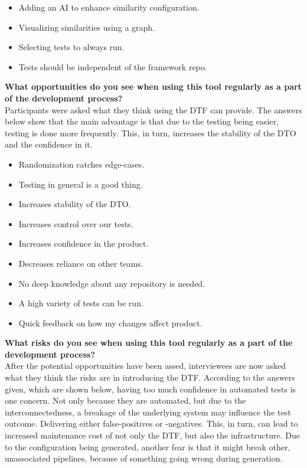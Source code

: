 \begin{itemize}
    \item Adding an AI to enhance similarity configuration.
    \item Visualizing similarities using a graph.
    \item Selecting tests to always run.
    \item Tests should be independent of the framework repo.
\end{itemize}

\textbf{What opportunities do you see when using this tool regularly as a part of the development process?}\\
Participants were asked what they think using the DTF can provide.
The answers below show that the main advantage is that due to the testing being easier, testing is done more frequently.
This, in turn, increases the stability of the DTO and the confidence in it.

\begin{itemize}
    \item Randomization catches edge-cases.
    \item Testing in general is a good thing.
    \item Increases stability of the DTO.
    \item Increases control over our tests.
    \item Increases confidence in the product.
    \item Decreases reliance on other teams.
    \item No deep knowledge about any repository is needed.
    \item A high variety of tests can be run.
    \item Quick feedback on how my changes affect product.
\end{itemize}

\textbf{What risks do you see when using this tool regularly as a part of the development process?}\\
After the potential opportunities have been assed, interviewees are now asked what they think the risks are in introducing the DTF.
According to the answers given, which are shown below, having too much confidence in automated tests is one concern.
Not only because they are automated, but due to the interconnectedness, a breakage of the underlying system may influence the test outcome.
Delivering either false-positives or -negatives.
This, in turn, can lead to increased maintenance cost of not only the DTF, but also the infrastructure.
Due to the configuration being generated, another fear is that it might break other, unassociated pipelines, because of something going wrong during generation.


